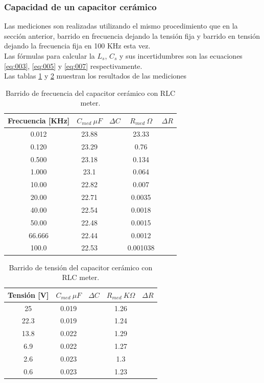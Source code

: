\documentclass[a4paper,10pt]{article}
\begin{document}
		\subsubsection{Capacidad de un capacitor cer\'amico}
		\indent Las mediciones son realizadas utilizando el mismo procedimiento
		que en la sección anterior, barrido en frecuencia dejando la tensión 
		fija y barrido en tensión dejando la frecuencia fija en 100 KHz esta 
		vez. \\
		\indent Las fórmulas para calcular la $L_s$, $C_s$ y sus incertidumbres 
		son las ecuaciones \ref{eq:003}, \ref{eq:005} y \ref{eq:007} 
		respectivamente. \\
		\indent Las tablas \ref{tab:006} y \ref{tab:007} muestran los resultados
		de las mediciones 
	
		\begin{table}[!htp]
			\centering
			\begin{tabular}{|c|c|c|c|c|}
				\hline
				Frecuencia [KHz] & $C_{med}~\mu F$ & $\Delta C$ & 
				$R_{med}~\Omega$ & $\Delta R$ \\
				\hline
				0.012 &	23.88 &   &	23.33 & \\
				\hline
				0.120 &	23.29 &   &	0.76 & \\
				\hline
				0.500 &	23.18 &   & 0.134 & \\
				\hline
				1.000 &	23.1 &   &	0.064 & \\
				\hline
				10.00 &	22.82 &   & 0.007 & \\
				\hline
				20.00 &	22.71 &   & 0.0035 & \\
				\hline
				40.00 &	22.54 &   &	0.0018 & \\
				\hline
				50.00 &	22.48 &   &	0.0015 & \\
				\hline
				66.666 & 22.44 &   & 0.0012 & \\
				\hline
				100.0 &	22.53 &   &	0.001038 & \\
				\hline
			\end{tabular}
			\caption{Barrido de frecuencia del capacitor cerámico con RLC 
			meter.} 
			\label{tab:006}
		\end{table}	

		\begin{table}[!htp]
			\centering
			\begin{tabular}{|c|c|c|c|c|}
				\hline
				Tensión [V] & $C_{med}~\mu F$ & $\Delta C$ & $R_{med}~K\Omega$
				& $\Delta R$\\
				\hline
				25 &	0.019 &   & 1.26 & \\
				\hline
				22.3 &	0.019 &   & 1.24 & \\
				\hline
				13.8 &	0.022 &   & 1.29 & \\
				\hline
				6.9 &	0.022 &	  & 1.27 & \\
				\hline
				2.6 &	0.023 &	  & 1.3 & \\
				\hline
				0.6 &	0.023 &   & 1.23 & \\
				\hline	  
			\end{tabular}
			\caption{Barrido de tensión del capacitor cerámico con RLC 
			meter.} 
			\label{tab:007}
		\end{table}	
		
\end{document}
